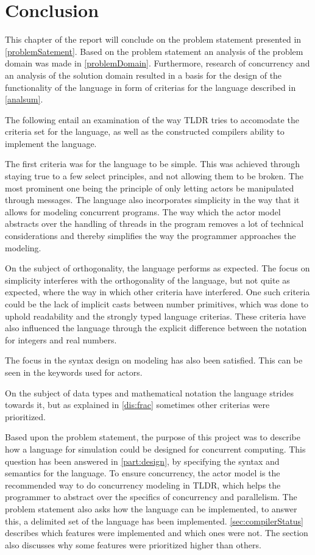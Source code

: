 \chapter{Conclusion}


This chapter of the report will conclude on the problem statement presented in \cref{problemSatement}. Based on the problem statement an analysis of the problem domain was made in \cref{problemDomain}. Furthermore, research of concurrency and an analysis of the solution domain resulted in a basis for the design of the functionality of the language in form of criterias for the language described in \cref{analsum}.

The following entail an examination of the way TLDR tries to accomodate the criteria set for the language, as well as the constructed compilers ability to implement the language.

The first criteria was for the language to be simple. This was achieved through staying true to a few select principles, and not allowing them to be broken. The most prominent one being the principle of only letting actors be manipulated through messages. The language also incorporates simplicity in the way that it allows for modeling concurrent programs. The way which the actor model abstracts over the handling of threads in the program removes a lot of technical considerations and thereby simplifies the way the programmer approaches the modeling.

On the subject of orthogonality, the language performs as expected. The focus on simplicity interferes with the orthogonality of the language, but not quite as expected, where the way in which other criteria have interfered. One such criteria could be the lack of implicit casts between number primitives, which was done to uphold readability and the strongly typed language criterias. These criteria have also influenced the language through the explicit difference between the notation for integers and real numbers.

The focus in the syntax design on modeling has also been satisfied. This can be seen in the keywords used for actors.

On the subject of data types and mathematical notation the language strides towards it, but as explained in \cref{dis:frac} sometimes other criterias were prioritized.

Based upon the problem statement, the purpose of this project was to describe how a language for simulation could be designed for concurrent computing. This question has been answered in \cref{part:design}, by specifying the syntax and semantics for the language.
To ensure concurrency, the actor model is the recommended way to do concurrency modeling in TLDR, which helps the programmer to abstract over the specifics of concurrency and parallelism.
The problem statement also asks how the language can be implemented, to answer this, a delimited set of the language has been implemented. \cref{sec:compilerStatus} describes which features were implemented and which ones were not. The section also discusses why some features were prioritized higher than others.

